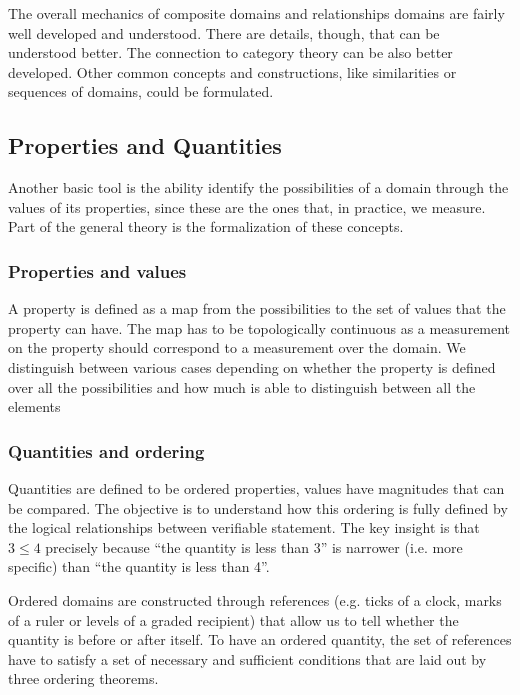 \documentclass[twocolumn]{article}
\begin{document}
The overall mechanics of composite domains and relationships domains are fairly well developed and understood. There are details, though, that can be understood better. The connection to category theory can be also better developed. Other common concepts and constructions, like similarities or sequences of domains, could be formulated.

\subsection{Properties and Quantities}

Another basic tool is the ability identify the possibilities of a domain through the values of its properties, since these are the ones that, in practice, we measure. Part of the general theory is the formalization of these concepts.

\subsubsection{Properties and values}

A property is defined as a map from the possibilities to the set of values that the property can have. The map has to be topologically continuous as a measurement on the property should correspond to a measurement over the domain. We distinguish between various cases depending on whether the property is defined over all the possibilities and how much is able to distinguish between all the elements

\subsubsection{Quantities and ordering}

Quantities are defined to be ordered properties, values have magnitudes that can be compared. The objective is to understand how this ordering is fully defined by the logical relationships between verifiable statement. The key insight is that $3 \leq 4$ precisely because ``the quantity is less than 3'' is narrower (i.e. more specific) than ``the quantity is less than 4''.

Ordered domains are constructed through references (e.g. ticks of a clock, marks of a ruler or levels of a graded recipient) that allow us to tell whether the quantity is before or after itself. To have an ordered quantity, the set of references have to satisfy a set of necessary and sufficient conditions that are laid out by three ordering theorems. 
\end{document}
